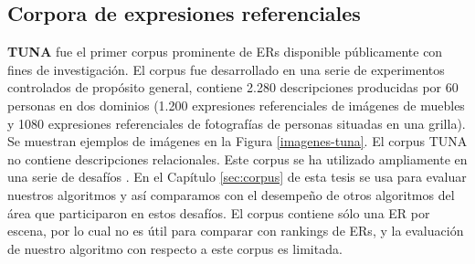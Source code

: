 %



\subsection{Corpora de expresiones referenciales}
\label{sec:corpus2}
\label{sec:corpusTUNA}


{\bf TUNA} \cite{tuna-corpus} fue el primer corpus prominente de ERs disponible p\'ublicamente con fines de investigaci\'on. El corpus fue desarrollado en una serie de experimentos controlados de prop\'osito general, contiene 2.280 descripciones producidas por 60 personas en dos dominios (1.200 expresiones referenciales de im\'agenes de muebles y 1080 expresiones referenciales de fotograf\'ias de personas situadas en una grilla). Se muestran ejemplos de im\'agenes en la Figura \ref{imagenes-tuna}. El corpus TUNA no contiene descripciones relacionales. Este corpus se ha utilizado ampliamente en una serie de desaf\'ios \cite{reg2009}. En el Cap\'itulo \ref{sec:corpus} de esta tesis se usa para evaluar nuestros algoritmos y as\'i comparamos con el desempe\~no de otros algoritmos del \'area que participaron en estos desaf\'ios. El corpus contiene s\'olo una ER por escena, por lo cual no es \'util para comparar con rankings de ERs, y la evaluaci\'on de nuestro algoritmo con respecto a este corpus es limitada.\\


